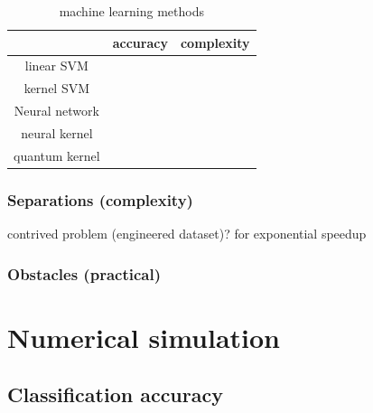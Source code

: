 \documentclass[
10pt,
aps,
pra,
linenumbers,
floatfix,
]{revtex4-2}
\theoremstyle{plain}
\theoremstyle{definition}
\begin{document}
\begin{table}[!ht]
	\centering
	\begin{tabular}{c|c|c}
		& accuracy & complexity \\
		\hline
		linear SVM & & \\  
		kernel SVM & & \\  
		Neural network & & \\  
		neural kernel & & \\  
		quantum kernel & & \\  
		\hline
	\end{tabular}
	\caption{machine learning methods}
\end{table}

\subsubsection{Separations (complexity)}
contrived problem (engineered dataset)? for exponential speedup

\subsubsection{Obstacles (practical)}

\section{Numerical simulation}
\subsection{Classification accuracy}
\end{document}
